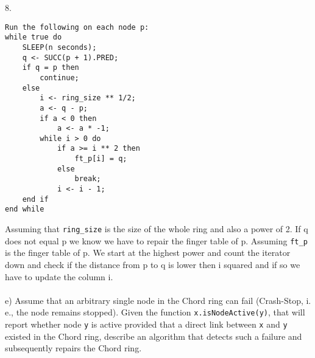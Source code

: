 \documentclass{article}
\begin{document}
8.
\begin{lstlisting}[style=CStyle]
Run the following on each node p:
while true do
    SLEEP(n seconds);
    q <- SUCC(p + 1).PRED;
    if q = p then
        continue;
    else
        i <- ring_size ** 1/2;
        a <- q - p;
        if a < 0 then
            a <- a * -1;
        while i > 0 do
            if a >= i ** 2 then
                ft_p[i] = q;
            else
                break;
            i <- i - 1;
    end if
end while
\end{lstlisting}
Assuming that \texttt{ring\_size} is the size of the whole ring and also a power of 2. If q does not equal p we know
we have to repair the finger table of p. Assuming \texttt{ft\_p} is the finger table of p. We start at the highest
power and count the iterator down and check if the distance from p to q is lower then i squared and if so we have
to update the column i.\\
\\
e) Assume that an arbitrary single node in the Chord ring can fail (Crash-Stop, i. e., the node remains 
stopped). Given the function \texttt{x.isNodeActive(y)}, that will report whether node \texttt{y} is active 
provided that a direct link between \texttt{x} and \texttt{y} existed in the Chord ring, describe an 
algorithm that detects such a failure and subsequently repairs the Chord ring.\\
\\
\end{document}
